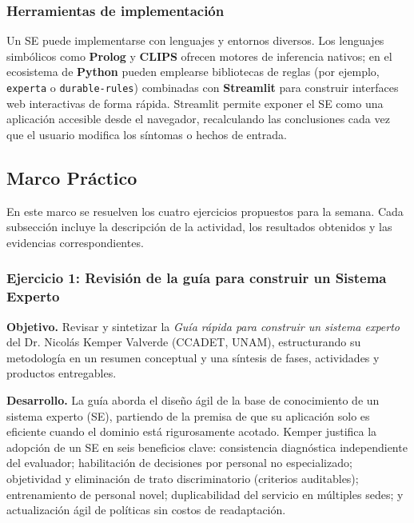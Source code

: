 \subsubsection{Herramientas de implementaci\'on}

Un SE puede implementarse con lenguajes y entornos diversos. Los
lenguajes simb\'olicos como \textbf{Prolog} y \textbf{CLIPS} ofrecen
motores de inferencia nativos; en el ecosistema de \textbf{Python}
pueden emplearse bibliotecas de reglas (por ejemplo, \texttt{experta} o
\texttt{durable-rules}) combinadas con \textbf{Streamlit} para construir
interfaces web interactivas de forma r\'apida. Streamlit permite exponer
el SE como una aplicaci\'on accesible desde el navegador, recalculando
las conclusiones cada vez que el usuario modifica los s\'intomas o
hechos de entrada.

\subsection{Marco Pr\'actico}

En este marco se resuelven los cuatro ejercicios propuestos para la
semana. Cada subsecci\'on incluye la descripci\'on de la actividad, los
resultados obtenidos y las evidencias correspondientes.

\subsubsection{Ejercicio 1: Revisi\'on de la gu\'ia para construir un Sistema Experto}

\textbf{Objetivo.} Revisar y sintetizar la \emph{Gu\'ia r\'apida para
construir un sistema experto} del Dr. Nicol\'as Kemper Valverde (CCADET,
UNAM), estructurando su metodolog\'ia en un resumen conceptual y una
s\'intesis de fases, actividades y productos entregables.

\textbf{Desarrollo.} La gu\'ia aborda el dise\~no \'agil de la base de
conocimiento de un sistema experto (SE), partiendo de la premisa de que
su aplicaci\'on solo es eficiente cuando el dominio est\'a rigurosamente
acotado. Kemper justifica la adopci\'on de un SE en seis beneficios clave:
consistencia diagn\'ostica independiente del evaluador; habilitaci\'on de
decisiones por personal no especializado; objetividad y eliminaci\'on de
trato discriminatorio (criterios auditables); entrenamiento de personal
novel; duplicabilidad del servicio en m\'ultiples sedes; y
actualizaci\'on \'agil de pol\'iticas sin costos de readaptaci\'on.

